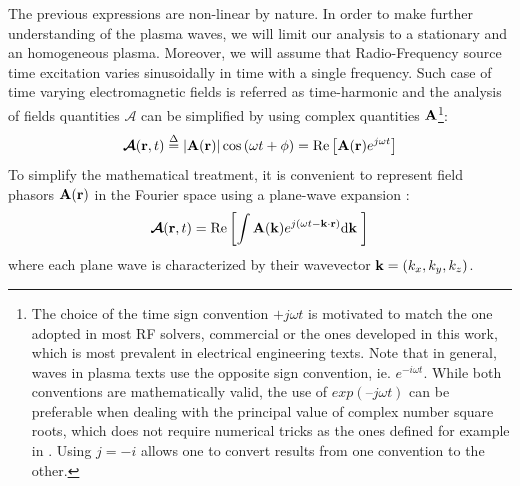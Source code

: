 The previous expressions are non-linear by nature. In order to make further understanding of the plasma waves, we will limit our analysis to a stationary and an homogeneous plasma. Moreover, we will assume that Radio-Frequency source time excitation varies sinusoidally in time with a single frequency. Such case of time varying electromagnetic fields is referred as time-harmonic   and the analysis of fields quantities $\boldsymbol{\mathcal{A}}$ can be simplified by using complex quantities ${\mathbf A}$\footnote{The choice of the time sign convention $+j\omega t$ is motivated to match the one adopted in most RF solvers, commercial or the ones developed in this work, which is most prevalent in electrical engineering texts. Note that in general, waves in plasma texts use the opposite sign convention, ie. $e^{-i\omega t}$\cite{bradley2007, michelsen2019}. While both conventions are mathematically valid, the use of $exp(–j\omega t)$ can be preferable when dealing with the principal value of complex number square roots, which does not require numerical tricks as the ones defined for example in \cite{Hillairet2007a}. Using $j=-i$ allows one to convert results from one convention to the other.}:
\begin{equation}
\boldsymbol{\mathcal{A}}({\mathbf r},t) 
	\stackrel{\Delta}{=} 
	\left| {\mathbf A}({\mathbf r}) \right| \cos\left(\omega t + \phi \right) 
	= 
	\Re \left[ {\mathbf A}({\mathbf r}) e^{j\omega t} \right]
\end{equation}
To simplify the mathematical treatment, it is convenient to represent field phasors ${\mathbf A}(\mathbf{r})$ in the Fourier space using a plane-wave expansion : 
\begin{equation}
		\boldsymbol{\mathcal{A}}(\mathbf{r}, t) 
		=
		\Re \left[
		\int 
		\mathbf{A}({\mathbf k}) e^{j(\omega t - {\mathbf k}\cdot{\mathbf r})}
		{\mathrm{d}} {\mathbf k} \;
		\right]
	\label{eq:k-spectralDefinition}
\end{equation}
where each plane wave is characterized by their wavevector ${\mathbf k}=(k_x, k_y, k_z)$. 


